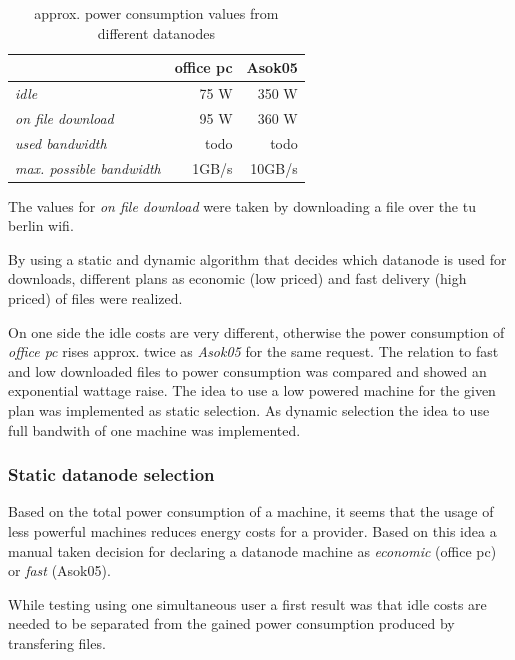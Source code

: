 \begin{table}
	\centering
	\caption{approx. power consumption values from different datanodes}	
	\begin{tabular}{|l|r|r|}
		\hline \rule[-2ex]{0pt}{5.5ex}  & \textbf{office pc} & \textbf{Asok05} \\ 
		\hline \rule[-2ex]{0pt}{5.5ex} \textit{idle} &   75 W &   350 W \\ 
		\hline \rule[-2ex]{0pt}{5.5ex} \textit{on file download} &   95 W &   360 W \\ 
		\hline \rule[-2ex]{0pt}{5.5ex} \textit{used bandwidth} & todo & todo \\
		\hline \rule[-2ex]{0pt}{5.5ex} \textit{max. possible bandwidth} & 1GB/s & 10GB/s \\
		\hline
	\end{tabular} 
	\label{tab:powerconsumptionvalues}
\end{table}

The values for \textit{on file download} were taken by downloading a file over the tu berlin wifi.

By using a static and dynamic algorithm that decides which datanode is used for downloads, different plans as economic (low priced) and fast delivery (high priced) of files were realized.

On one side the idle costs are very different, otherwise the power consumption of \textit{office pc} rises approx. twice as \textit{Asok05} for the same request. The relation to fast and low downloaded files to power consumption was compared and showed an exponential wattage raise. The idea to use a low powered machine for the given plan was implemented as static selection. As dynamic selection the idea to use full bandwith of one machine was implemented.

\subsubsection{Static datanode selection}

Based on the total power consumption of a machine, it seems that the usage of less powerful machines reduces energy costs for a provider. Based on this idea a manual taken decision for declaring a datanode machine as \textit{economic} (office pc) or \textit{fast} (Asok05). 

While testing using one simultaneous user a first result was that idle costs are needed to be separated from the gained power consumption produced by transfering files. 

